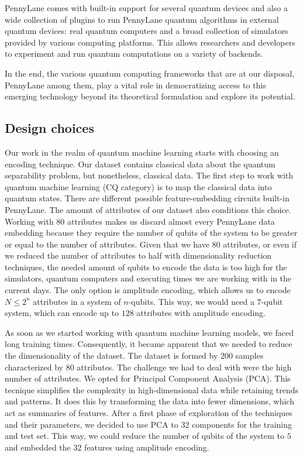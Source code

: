 PennyLane comes with built-in support for several quantum devices and also a wide collection of plugins to run PennyLane quantum algorithms in external quantum devices: real quantum computers and a broad collection of simulators provided by various computing platforms. This allows researchers and developers to experiment and run quantum computations on a variety of backends.  

In the end, the various quantum computing frameworks that are at our disposal, PennyLane among them, play a vital role in democratizing access to this emerging technology beyond its theoretical formulation and explore its potential.

\subsection{Design choices}
Our work in the realm of quantum machine learning starts with choosing an encoding technique. Our dataset contains classical data about the quantum separability problem, but nonetheless, classical data. The first step to work with quantum machine learning (CQ category) is to map the classical data into quantum states. There are different possible feature-embedding circuits built-in PennyLane. The amount of attributes of our dataset also conditions this choice. Working with 80 attributes makes us discard almost every PennyLane data embedding because they require the number of qubits of the system to be greater or equal to the number of attributes. Given that we have 80 attributes, or even if we reduced the number of attributes to half with dimensionality reduction techniques, the needed amount of qubits to encode the data is too high for the simulators, quantum computers and executing times we are working with in the current days. The only option is amplitude encoding, which allows us to encode $N \leq 2^n$ attributes in a system of $n$-qubits. This way, we would need a $7$-qubit system, which can encode up to $128$ attributes with amplitude encoding. 

As soon as we started working with quantum machine learning models, we faced long training times. Consequently, it became apparent that we needed to reduce the dimensionality of the dataset. The dataset is formed by $200$ samples characterized by $80$ attributes. The challenge we had to deal with were the high number of attributes. We opted for Principal Component Analysis (PCA). This tecnique simplifies the complexity in high-dimensional data while retaining trends and patterns. It does this by transforming the data into fewer dimensions, which act as summaries of features. After a first phase of exploration of the techniques and their parameters, we decided to use PCA to 32 components for the training and test set. This way, we could reduce the number of qubits of the system to $5$ and embedded the $32$ features using amplitude encoding. 

